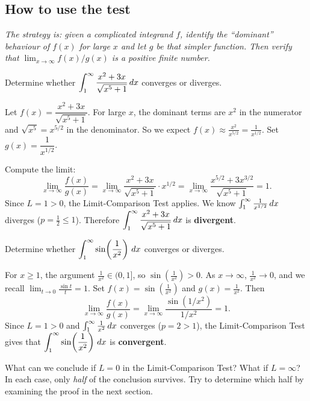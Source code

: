\subsection*{How to use the test}

\textit{The strategy is: given a complicated integrand $f$, identify the ``dominant'' behaviour of $f(x)$ for large $x$ and let $g$ be that simpler function.  Then verify that $\lim_{x\to\infty}f(x)/g(x)$ is a positive finite number.}

\begin{example}
\label{ex:12-12}
Determine whether $\displaystyle\int_{1}^{\infty}\frac{x^{2}+3x}{\sqrt{x^{5}+1}}\,dx$ converges or diverges.

Let $f(x)=\dfrac{x^{2}+3x}{\sqrt{x^{5}+1}}$.  For large $x$, the dominant terms are $x^{2}$ in the numerator and $\sqrt{x^{5}}=x^{5/2}$ in the denominator.  So we expect $f(x)\approx \frac{x^{2}}{x^{5/2}}=\frac{1}{x^{1/2}}$.  Set $g(x)=\dfrac{1}{x^{1/2}}$.

Compute the limit:
\[
  \lim_{x\to\infty}\frac{f(x)}{g(x)}
  = \lim_{x\to\infty}\frac{x^{2}+3x}{\sqrt{x^{5}+1}}\cdot x^{1/2}
  = \lim_{x\to\infty}\frac{x^{5/2}+3x^{3/2}}{\sqrt{x^{5}+1}}
  = 1.
\]
Since $L=1>0$, the Limit-Comparison Test applies.  We know $\int_{1}^{\infty}\frac{1}{x^{1/2}}\,dx$ diverges ($p=\frac{1}{2}\le 1$).  Therefore $\displaystyle\int_{1}^{\infty}\frac{x^{2}+3x}{\sqrt{x^{5}+1}}\,dx$ is \textbf{divergent}.
\end{example}

\begin{example}
\label{ex:12-13}
Determine whether $\displaystyle\int_{1}^{\infty}\sin\!\left(\frac{1}{x^{2}}\right)\,dx$ converges or diverges.

For $x\ge 1$, the argument $\frac{1}{x^{2}}\in(0,1]$, so $\sin\!\left(\frac{1}{x^{2}}\right)>0$.  As $x\to\infty$, $\frac{1}{x^{2}}\to 0$, and we recall $\lim_{t\to 0}\frac{\sin t}{t}=1$.  Set $f(x)=\sin\!\left(\frac{1}{x^{2}}\right)$ and $g(x)=\frac{1}{x^{2}}$.  Then
\[
  \lim_{x\to\infty}\frac{f(x)}{g(x)}
  = \lim_{x\to\infty}\frac{\sin(1/x^{2})}{1/x^{2}}
  = 1.
\]
Since $L=1>0$ and $\int_{1}^{\infty}\frac{1}{x^{2}}\,dx$ converges ($p=2>1$), the Limit-Comparison Test gives that $\displaystyle\int_{1}^{\infty}\sin\!\left(\frac{1}{x^{2}}\right)\,dx$ is \textbf{convergent}.
\end{example}

\begin{remark}
What can we conclude if $L=0$ in the Limit-Comparison Test?  What if $L=\infty$?  In each case, only \emph{half} of the conclusion survives.  Try to determine which half by examining the proof in the next section.
\end{remark}

